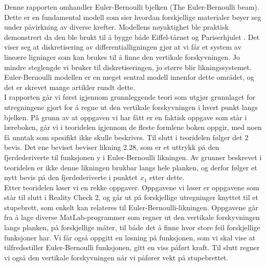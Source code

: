 Denne rapporten omhandler Euler-Bernoulli bjelken (The Euler-Bernoulli beam). Dette er en fundamental modell som sier hvordan forskjellige materialer bøyer seg under påvirkning av diverse krefter. Modellens nøyaktighet ble praktisk demonstrert da den ble brukt til å bygge både Eiffel-tårnet og Pariserhjulet \cite{NdogmoEB}.  Det viser seg at diskretisering av differentialligningen gjør at vi får et system av lineære ligninger som kan brukes til å finne den vertikale forskyvningen. Jo mindre steglengde vi bruker til diskretiseringen, jo større blir likningssystemet. Euler-Bernoulli modellen er en meget sentral modell innenfor dette området, og det er skrevet mange artikler rundt dette. \\

I rapporten går vi først igjennom grunnleggende teori som utgjør grunnlaget for utregningene gjort for å regne ut den vertikale forskyvningen i hvert punkt langs bjelken. På grunn av at oppgaven vi har fått er en faktisk oppgave som står i læreboken, går vi i teoridelen igjennom de fleste formlene boken oppgir, med noen få unntak som spesifikt ikke skulle beskrives. Til slutt i teoridelen følger det 2 bevis. Det ene beviset beviser likning 2.28, som er et uttrykk på den fjerdederiverte til funksjonen y i Euler-Bernoulli likningen. Av grunner beskrevet i teoridelen er ikke denne likningen brukbar langs hele planken, og derfor følger et nytt bevis på den fjerdederiverte i punktet $x_1$ etter dette. \\

Etter teoridelen løser vi en rekke oppgaver. Oppgavene vi løser er oppgavene som står til slutt i Reality Check 2, og går ut på forskjellige utregninger knyttet til et stupebrett, som enkelt kan relateres til Euler-Bernoulli-likningen. Oppgavene går fra å lage diverse MatLab-programmer som regner ut den vertikale forskyvningen langs planken, på forskjellige måter, til både det å finne hvor store feil forskjellige funksjoner har. Vi får også oppgitt en løsning på funksjonen, som vi skal vise at tilfredsstiller Euler-Bernoulli funksjonen, gitt en viss påført kraft. Til slutt regner vi også den vertikale forskyvningen når vi påfører vekt på stupebrettet. \\ 